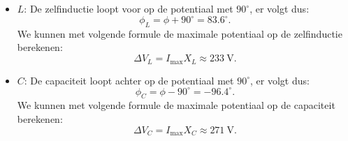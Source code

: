 \begin{enumerate}[(a)]
\begin{description}[labelwidth=1.5cm, leftmargin=!]
\begin{itemize}
\begin{equation*}
                        \Delta V_R = I_{\text{max}} R \approx 338 \ \text{V}.
                    \end{equation*}
                \item $L$:
                    De zelfinductie loopt voor op de potentiaal met $90^\circ$, er volgt dus:
                    \begin{equation*}
                        \phi_L = \phi + 90^\circ = 83.6^\circ.
                    \end{equation*} 
                    We kunnen met volgende formule de maximale potentiaal op de zelfinductie berekenen:
                    \begin{equation*}
                        \Delta V_L = I_{\text{max}} X_L \approx 233 \ \text{V}.
                    \end{equation*}
                \item $C$:
                    De capaciteit loopt achter op de potentiaal met $90^\circ$, er volgt dus:
                    \begin{equation*}
                        \phi_C = \phi - 90^\circ = -96.4^\circ.
                    \end{equation*}
                    We kunnen met volgende formule de maximale potentiaal op de capaciteit berekenen:
                    \begin{equation*}
                        \Delta V_C = I_{\text{max}} X_C \approx 271 \ \text{V}.
                    \end{equation*}
            \end{itemize}
        \end{description}
\end{enumerate}

\vspace{1cm}